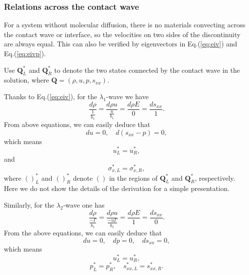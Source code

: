 \documentclass[review]{elsarticle}
\numberwithin{equation}{section}
\numberwithin{table}{section}
\begin{document}
\subsubsection{Relations across the contact wave}\label{sec:contacte}
  For  a  system without molecular diffusion, there is no materials convecting  across the contact wave or interface, so the velocities on two sides of  the discontinuity are always equal. %
  This can also be verified by eigenvectors in Eq.(\ref{eq:eiv}) and  Eq.(\ref{eq:eivp}).

Use $\mathbf{Q}_L^*$ and $\mathbf{Q}_R^*$ to denote the two states connected by  the contact wave in the solution, where $\mathbf{Q}=\left(\rho,u,p,s_{xx}\right)$.


Thanks to Eq.(\ref{eq:eiv}), for the $\lambda_{1}$-wave we
have
\begin{equation}   \label{e23a}
\frac{d \rho}{\frac{1}{b_{1}}} = \frac{d \rho u}{\frac{u
}{b_{1}}}=\frac{d \rho E}{0} = \frac{d s_{xx}}{1}.
\end{equation}
From above equations, we can easily deduce that
\begin{equation}   \label{e23b}
du = 0, \quad d(s_{xx}-p)=0,
\end{equation}
 which means
\begin{equation}   \label{e23c}
  u_{L}^{\ast}=u_{R}^{\ast},
\end{equation}
and
\begin{equation}   \label{e23d}
\sigma_{x,L}^{\ast}=\sigma_{x,R}^{\ast},
\end{equation}
where $()_{L}^{\ast}$ and $()_{R}^{\ast}$ denote $()$ in the regions
of $\mathbf{Q}_{L}^{\ast}$ and $\mathbf{Q}_{R}^{\ast}$,
respectively. Here we do not show the details of the derivation for a simple
 presentation.


Similarly, for the $\lambda_{2}$-wave one
has
\begin{equation}   \label{e24a}
\frac{d \rho}{\frac{-\Gamma}{b_{1}}} = \frac{d \rho u}{\frac{-u
\Gamma}{b_{1}}}=\frac{d \rho E}{1} = \frac{d s_{xx}}{0}.
\end{equation}
From the above equations, we can easily deduce  that
\begin{equation}   \label{e24b}
du = 0, \quad dp=0, \quad ds_{xx}=0,
\end{equation}
 which means
\begin{equation}   \label{e24c}
  u_{L}^{\ast}=u_{R}^{\ast},
\end{equation}
\begin{equation}   \label{e24d}
p_{L}^{\ast}=p_{R}^{\ast}, \quad
  s_{xx,L}^{\ast}=s_{xx,R}^{\ast}.
\end{equation}
\end{document}
